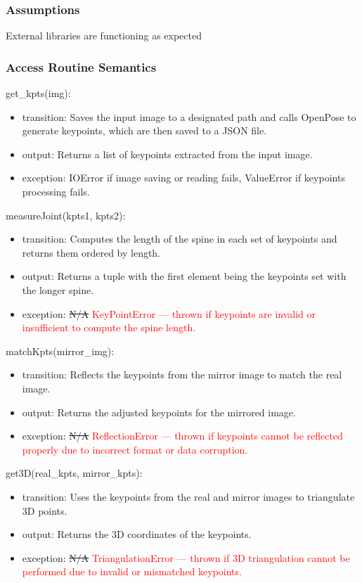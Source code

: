 \documentclass[12pt, titlepage]{article}
\newcommand{\rt}[1]{\textcolor{red}{#1}}
\begin{document}
\subsubsection{Assumptions}
External libraries are functioning as expected

\subsubsection{Access Routine Semantics}
\noindent get\_kpts(img):
\begin{itemize}
\item transition: Saves the input image to a designated path and calls OpenPose to
  generate keypoints, which are then saved to a JSON file.
\item output: Returns a list of keypoints extracted from the input image.
\item exception: IOError if image saving or reading fails, ValueError if keypoints
  processing fails.
\end{itemize}

\noindent measureJoint(kpts1, kpts2):
\begin{itemize}
\item transition: Computes the length of the spine in each set of keypoints and
  returns them ordered by length.
\item output: Returns a tuple with the first element being the keypoints set with
  the longer spine.
\item exception: \sout{N/A} \rt{KeyPointError --- thrown if keypoints are invalid or insufficient to compute the spine length.}
\end{itemize}

\noindent matchKpts(mirror\_img):
\begin{itemize}
\item transition: Reflects the keypoints from the mirror image to match the real
  image.
\item output: Returns the adjusted keypoints for the mirrored image.
\item exception: \sout{N/A} \rt{ReflectionError --- thrown if keypoints cannot be reflected properly due to incorrect format or data corruption.}
\end{itemize}

\noindent get3D(real\_kpts, mirror\_kpts):
\begin{itemize}
\item transition: Uses the keypoints from the real and mirror images to triangulate
  3D points.
\item output: Returns the 3D coordinates of the keypoints.
\item exception: \sout{N/A} \rt{TriangulationError --- thrown if 3D triangulation cannot be performed due to invalid or mismatched keypoints.}
\end{itemize}
\end{document}
